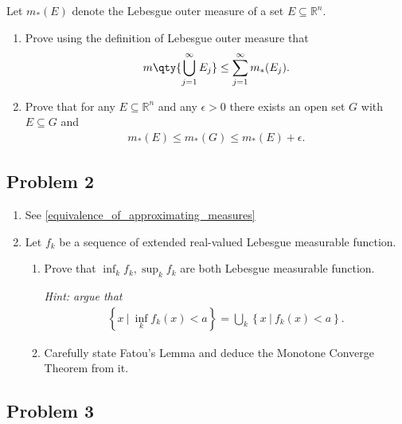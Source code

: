 Let \(m_*(E)\) denote the Lebesgue outer measure of a set
\(E \subseteq {\mathbb{R}}^n\).

\begin{enumerate}
\def\labelenumi{\alph{enumi}.}
\item
  Prove using the definition of Lebesgue outer measure that
  \begin{align*}
  m \qty{ \displaystyle\bigcup_{j=1}^{\infty } E_j  } \leq \sum_{j=1}^{\infty } m_*(E_j) 
  .\end{align*}
\item
  Prove that for any \(E \subseteq {\mathbb{R}}^n\) and any
  \(\epsilon> 0\) there exists an open set \(G\) with \(E \subseteq G\)
  and
  \begin{align*}
  m_*(E) \leq m_*(G) \leq m_*(E) + \epsilon
  .\end{align*}
\end{enumerate}

\hypertarget{problem-2-2}{%
\subsection{Problem 2}\label{problem-2-2}}

\begin{enumerate}
\def\labelenumi{\alph{enumi}.}
\item
  See \cref{equivalence_of_approximating_measures}
\item
  Let \(f_k\) be a sequence of extended real-valued Lebesgue measurable
  function.

  \begin{enumerate}
  \def\labelenumii{\roman{enumii}.}
  \item
    Prove that \(\inf_k f_k, \sup_k f_k\) are both Lebesgue measurable
    function.

    \emph{Hint: argue that}
    \begin{align*}
    \left\{{x {~\mathrel{\Big|}~}\inf_k f_k(x) < a}\right\} = \displaystyle\bigcup_k \left\{{x {~\mathrel{\Big|}~}f_k(x) < a}\right\}
    .\end{align*}
  \item
    Carefully state Fatou's Lemma and deduce the Monotone Converge
    Theorem from it.
  \end{enumerate}
\end{enumerate}

\hypertarget{problem-3-2}{%
\subsection{Problem 3}\label{problem-3-2}}

